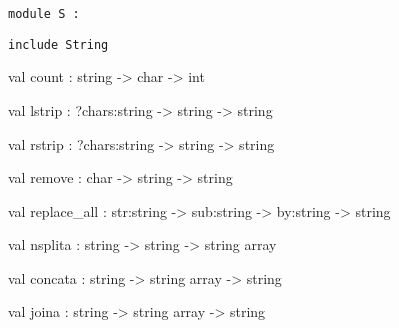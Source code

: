 \documentclass[11pt]{article}
\begin{document}
\begin{ocamldoccode}
{\tt{module }}{\tt{S}}{\tt{ : }}\end{ocamldoccode}
\label{module:Util.S}

\begin{ocamldocsigend}


{\tt{include }}{\tt{String}}

\label{val:Util.S.count}\begin{ocamldoccode}
val count : string -> char -> int
\end{ocamldoccode}


\label{val:Util.S.lstrip}\begin{ocamldoccode}
val lstrip : ?chars:string -> string -> string
\end{ocamldoccode}


\label{val:Util.S.rstrip}\begin{ocamldoccode}
val rstrip : ?chars:string -> string -> string
\end{ocamldoccode}


\label{val:Util.S.remove}\begin{ocamldoccode}
val remove : char -> string -> string
\end{ocamldoccode}


\label{val:Util.S.replace-underscoreall}\begin{ocamldoccode}
val replace_all : str:string -> sub:string -> by:string -> string
\end{ocamldoccode}


\label{val:Util.S.nsplita}\begin{ocamldoccode}
val nsplita : string -> string -> string array
\end{ocamldoccode}


\label{val:Util.S.concata}\begin{ocamldoccode}
val concata : string -> string array -> string
\end{ocamldoccode}


\label{val:Util.S.joina}\begin{ocamldoccode}
val joina : string -> string array -> string
\end{ocamldoccode}
\end{ocamldocsigend}
\end{document}
